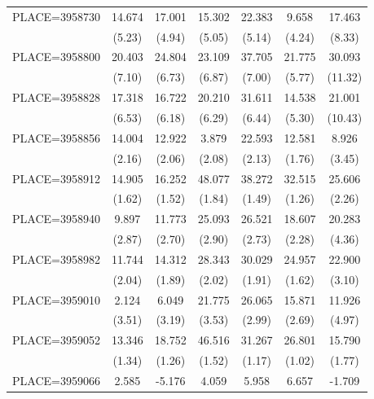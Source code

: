 {\begin{tabular}{l*{6}{c}}
PLACE=3958730       &      14.674&      17.001&      15.302&      22.383&       9.658&      17.463\\
                    &      (5.23)&      (4.94)&      (5.05)&      (5.14)&      (4.24)&      (8.33)\\
PLACE=3958800       &      20.403&      24.804&      23.109&      37.705&      21.775&      30.093\\
                    &      (7.10)&      (6.73)&      (6.87)&      (7.00)&      (5.77)&     (11.32)\\
PLACE=3958828       &      17.318&      16.722&      20.210&      31.611&      14.538&      21.001\\
                    &      (6.53)&      (6.18)&      (6.29)&      (6.44)&      (5.30)&     (10.43)\\
PLACE=3958856       &      14.004&      12.922&       3.879&      22.593&      12.581&       8.926\\
                    &      (2.16)&      (2.06)&      (2.08)&      (2.13)&      (1.76)&      (3.45)\\
PLACE=3958912       &      14.905&      16.252&      48.077&      38.272&      32.515&      25.606\\
                    &      (1.62)&      (1.52)&      (1.84)&      (1.49)&      (1.26)&      (2.26)\\
PLACE=3958940       &       9.897&      11.773&      25.093&      26.521&      18.607&      20.283\\
                    &      (2.87)&      (2.70)&      (2.90)&      (2.73)&      (2.28)&      (4.36)\\
PLACE=3958982       &      11.744&      14.312&      28.343&      30.029&      24.957&      22.900\\
                    &      (2.04)&      (1.89)&      (2.02)&      (1.91)&      (1.62)&      (3.10)\\
PLACE=3959010       &       2.124&       6.049&      21.775&      26.065&      15.871&      11.926\\
                    &      (3.51)&      (3.19)&      (3.53)&      (2.99)&      (2.69)&      (4.97)\\
PLACE=3959052       &      13.346&      18.752&      46.516&      31.267&      26.801&      15.790\\
                    &      (1.34)&      (1.26)&      (1.52)&      (1.17)&      (1.02)&      (1.77)\\
PLACE=3959066       &       2.585&      -5.176&       4.059&       5.958&       6.657&      -1.709\\

\end{tabular}}
